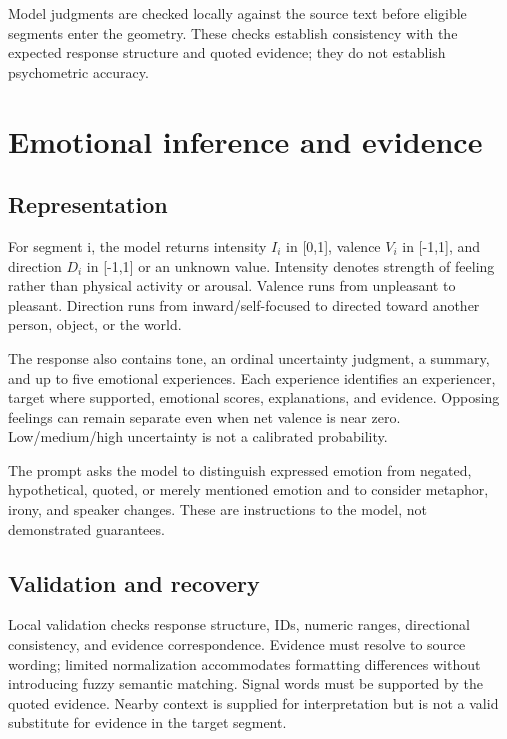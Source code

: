 \documentclass[manuscript,screen,nonacm]{acmart}
\begin{document}
Model judgments are checked locally against the source text before eligible segments enter the geometry. These checks establish consistency with the expected response structure and quoted evidence; they do not establish psychometric accuracy.

\section{Emotional inference and
evidence}\label{emotional-inference-and-evidence}

\subsection{Representation}\label{representation}

For segment i, the model returns intensity \(I_i\) in {[}0,1{]}, valence
\(V_i\) in {[}-1,1{]}, and direction \(D_i\) in {[}-1,1{]} or an unknown
value. Intensity denotes strength of feeling rather than physical
activity or arousal. Valence runs from unpleasant to pleasant. Direction
runs from inward/self-focused to directed toward another person, object,
or the world.

The response also contains tone, an ordinal uncertainty judgment, a
summary, and up to five emotional experiences. Each experience
identifies an experiencer, target where supported, emotional scores,
explanations, and evidence. Opposing feelings can remain separate even
when net valence is near zero. Low/medium/high uncertainty is not a
calibrated probability.

The prompt asks the model to distinguish expressed emotion from negated,
hypothetical, quoted, or merely mentioned emotion and to consider
metaphor, irony, and speaker changes. These are instructions to the
model, not demonstrated guarantees.

\subsection{Validation and recovery}\label{validation-and-recovery}

Local validation checks response structure, IDs, numeric ranges,
directional consistency, and evidence correspondence. Evidence must
resolve to source wording; limited normalization accommodates formatting
differences without introducing fuzzy semantic matching. Signal words
must be supported by the quoted evidence. Nearby context is supplied for
interpretation but is not a valid substitute for evidence in the target
segment.
\end{document}

